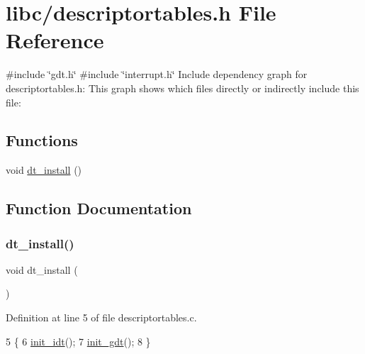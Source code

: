 \hypertarget{a00044}{}\section{libc/descriptortables.h File Reference}
\label{a00044}
{\ttfamily \#include \char`\"{}gdt.\+h\char`\"{}}\newline
{\ttfamily \#include \char`\"{}interrupt.\+h\char`\"{}}\newline
Include dependency graph for descriptortables.\+h\+:
This graph shows which files directly or indirectly include this file\+:
\subsection*{Functions}
\begin{DoxyCompactItemize}
\item 
void \hyperlink{a00044_a4c38e3f3ee100ca4323081bf0970c1ac_a4c38e3f3ee100ca4323081bf0970c1ac}{dt\+\_\+install} ()
\end{DoxyCompactItemize}


\subsection{Function Documentation}
\mbox{\label{a00044_a4c38e3f3ee100ca4323081bf0970c1ac_a4c38e3f3ee100ca4323081bf0970c1ac}} 
\subsubsection{\texorpdfstring{dt\+\_\+install()}{dt\_install()}}
{\footnotesize\ttfamily void dt\+\_\+install (\begin{DoxyParamCaption}{ }\end{DoxyParamCaption})}



Definition at line 5 of file descriptortables.\+c.


\begin{DoxyCode}
5                   \{
6     \hyperlink{a00071_a35fe413107af682030ab7a4b6dff19b8_a35fe413107af682030ab7a4b6dff19b8}{init\_idt}();
7     \hyperlink{a00065_a86bb50044169930202cc403376ef40c3_a86bb50044169930202cc403376ef40c3}{init\_gdt}();
8 \}
\end{DoxyCode}
